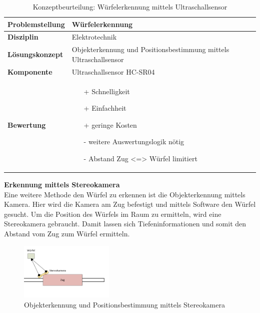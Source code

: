 \documentclass[../../../main.tex]{subfiles}
\begin{document}
    \begin{flushleft}
        \begin{table}[h]
        \begin{tabular}{ | l | p{11cm} |}
        \hline
        \textbf{Problemstellung} & Würfelerkennung \\ \hline
        \textbf{Disziplin} & Elektrotechnik \\ \hline
        \textbf{Lösungskonzept} & Objekterkennung und Positionsbestimmung mittels Ultraschallsensor \\ \hline
        \textbf{Komponente} & Ultraschallsensor HC-SR04 \\ \hline
        \textbf{Bewertung} &  \begin{itemize}
                                \item[+] Schnelligkeit
                                \item[+] Einfachheit
                                \item[+] geringe Kosten 
                                \item[-] weitere Auswertungslogik nötig
                                \item[-] Abstand Zug <=> Würfel limitiert   
                              \end{itemize} \\ \hline
        \end{tabular}
        \caption{Konzeptbeurteilung: Würfelerkennung mittels Ultraschallsensor}
        \label{tab:konzept_wurfel_ultraschall}
    \end{table}
    \end{flushleft}


    \textbf{Erkennung mittels Stereokamera }\\
    Eine weitere Methode den Würfel zu erkennen ist die Objekterkennung mittels Kamera. Hier wird die Kamera am Zug
    befestigt und mittels Software den Würfel gesucht. Um die Position des Würfels im Raum zu ermitteln, wird eine 
    Stereokamera gebraucht. Damit lassen sich Tiefeninformationen und somit den Abstand vom Zug zum Würfel ermitteln.\\
    
    \begin{figure}[H] %
        \centering
        \includegraphics[width=0.4\textwidth]{wurfel_Stereokamera.png}
        \caption{Objekterkennung und Positionsbestimmung mittels Stereokamera}
    \end{figure}
\end{document}
